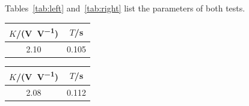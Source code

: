 \documentclass[state=Report]{mcidoc}
\begin{document}
Tables~\ref{tab:left} and~\ref{tab:right} list the parameters of both tests.
\begin{table}[H]
  \begin{floatrow}
      {\begin{tabular}{cc}
        \toprule
        $K$/(\unit{\volt\per\volt}) & $T$/\unit{\second} \\
        \midrule
        \num{2.10} & \num{0.105} \\
        \bottomrule
      \end{tabular}}
      {\begin{tabular}{cc}
        \toprule
        $K$/(\unit{\volt\per\volt}) & $T$/\unit{\second} \\
        \midrule
        \num{2.08} & \num{0.112} \\
        \bottomrule
      \end{tabular}}
  \end{floatrow}
\end{table}
\end{document}
